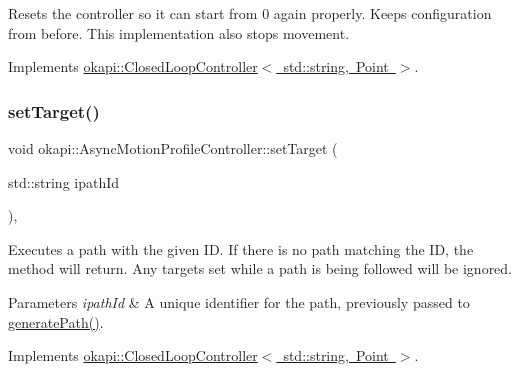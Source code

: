Resets the controller so it can start from 0 again properly. Keeps configuration from before. This implementation also stops movement. 

Implements \mbox{\hyperlink{classokapi_1_1ClosedLoopController_a7dd6ce28b3e38bdf987514a1b6c83c8c}{okapi\+::\+Closed\+Loop\+Controller$<$ std\+::string, Point $>$}}.

\mbox{\label{classokapi_1_1AsyncMotionProfileController_adf705d6bfd3d0a83d8a6c50a05ffd156}} 
\subsubsection{\texorpdfstring{setTarget()}{setTarget()}\hspace{0.1cm}{\footnotesize\ttfamily [1/2]}}
{\footnotesize\ttfamily void okapi\+::\+Async\+Motion\+Profile\+Controller\+::set\+Target (\begin{DoxyParamCaption}\item[{std\+::string}]{ipath\+Id }\end{DoxyParamCaption})\hspace{0.3cm}{\ttfamily [override]}, {\ttfamily [virtual]}}

Executes a path with the given ID. If there is no path matching the ID, the method will return. Any targets set while a path is being followed will be ignored.


\begin{DoxyParams}{Parameters}
{\em ipath\+Id} & A unique identifier for the path, previously passed to {\ttfamily \mbox{\hyperlink{classokapi_1_1AsyncMotionProfileController_a767919702ab379bac5273010baf03cda}{generate\+Path()}}}. \\
\hline
\end{DoxyParams}


Implements \mbox{\hyperlink{classokapi_1_1ClosedLoopController_ac14482d0768b3f157d52e0214a4c36d7}{okapi\+::\+Closed\+Loop\+Controller$<$ std\+::string, Point $>$}}.

\mbox{\label{classokapi_1_1AsyncMotionProfileController_a2846d2e36b86b39aa2e761e4e34cd225}} 
